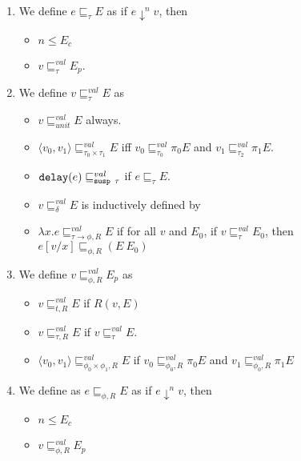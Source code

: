 \begin{defn}\leavevmode
  \label{def:ws_bounding_relations}
\begin{enumerate}
  \item We define $e \sqsubseteq_\tau E$ as if $e \downarrow^n v$, then \label{ws:bounding_rel_defn}
    \begin{itemize}
      \item $n \leq E_c$
      \item $v \sqsubseteq_\tau^{val} E_p$.
    \end{itemize}
  \item We define $v \sqsubseteq_\tau^{val} E$ as
    \begin{itemize}
      \item $v \sqsubseteq_{unit}^{val} E$ always.
      \item $\langle v_0,v_1 \rangle \sqsubseteq_{\tau_0 \times \tau_1}^{val} E$ iff $v_0 \sqsubseteq_{\tau_0}^{val} \pi_0 E$ and $v_1 \sqsubseteq_{\tau_2}^{val} \pi_1 E$.
      \item $\T{delay}(e) \sqsubseteq_{\T{susp }\tau}^{val}$ if $e \sqsubseteq_\tau E$.
      \item $v \sqsubseteq_\delta^{val} E$ is inductively defined by
        \begin{prooftree}
        \end{prooftree}
      \item $\lambda x.e \sqsubseteq^{val}_{\tau \to \phi,R} E$ if for all $v$ and $E_0$, if $v \sqsubseteq_\tau^{val} E_0$, then $e[v/x] \sqsubseteq_{\phi,R}(E\ E_0)$
    \end{itemize}
  \item We define $v \sqsubseteq_{\phi,R}^{val} E_p$ as
    \begin{itemize}
      \item $v \sqsubseteq_{t,R}^{val} E $ if $R(v,E)$
      \item $v \sqsubseteq_{\tau,R}^{val} E$ if $v \sqsubseteq_\tau^{val} E$.
      \item $\langle v_0,v_1\rangle \sqsubseteq_{\phi_0\times\phi_1,R}^{val} E$ if $v_0 \sqsubseteq_{\phi_0,R}^{val} \pi_0 E$ and $v_1 \sqsubseteq_{\phi_0,R}^{val} \pi_1 E$
    \end{itemize}
  \item We define as $e \sqsubseteq_{\phi,R} E$ as if $e \downarrow^n v$, then
    \begin{itemize}
      \item $n \leq E_c$
      \item $v \sqsubseteq_{\phi,R}^{val} E_p$
    \end{itemize}
\end{enumerate}
\end{defn}
